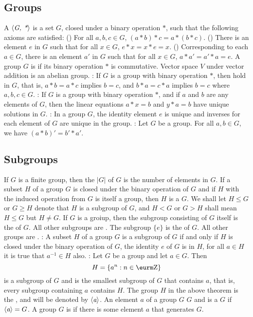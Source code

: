\documentclass{myproc}
\def\sbf{\sf\bfseries}
\begin{document}
\subsection{Groups}
\bit
\w A  $\mbox{$\langle{\textit{G, *}}\rangle$}$ is a set $G$, closed under a binary operation
$*$, such that the following axioms are satisfied:
  \ben
  \w [(a)] () 
  For all $a, b, c \in G$, $(a * b) * c = a * (b * c)$.
  \w [(b)] ()
  There is an element $e$ in $G$ such that for all $x \in G$,
  $e * x = x * e = x$.
  \w [(c)] ()
  Corresponding to each $a \in G$, there is an element 
  $a'$ in $G$ such that for all $x \in G$,
  $a * a' = a' * a = e$.
  \een
\w A group $G$ is  if its binary operation $*$ is commutative.
\w Vector space $V$ under vector addition is an abelian group.
\w {\sbf Theorem}: If $G$ is a group with binary operation $*$, then  hold in $G$, that is, $a * b = a * c$
implies $b = c$, and $b * a = c * a$ implies $b = c$ where $a, b, c \in G$.
\w {\sbf Theorem}: If $G$ is a group with binary operation $*$, and if $a$ and
$b$ are any elements of $G$, then the linear equations $a * x = b$ and $y * a
= b$ have unique solutions in $G$.
\w {\sbf Theorem}: In a group $G$,  the identity element $e$ is
unique and inverses for each element of $G$ are unique in the group.
\w {\sbf Corollary}: Let $G$ be a group. For all $a, b \in G$, we have $(a *
b)' = b' * a'$.
\eit

\subsection{Subgroups}
\bit
\w If $G$ is a finite group, then the  $|G|$ of $G$ is the number of
elements in $G$. 
\w If a subset $H$ of a group $G$ is closed under the binary operation of $G$
and if $H$ with the induced operation from $G$ is itself a group, then $H$ is
a  $G$. We shall let $H \le G$ or $G \ge H$ denote that $H$ is
a subgroup of $G$, and $H < G$ or $G > H$ shall mean $H \le G$ but $H \ne G$.
\w If $G$ is a groiup, then the subgroup consisting of $G$ itself is the
 of $G$. All other subgroups are . The subgroup $\{e\}$ is the  of $G$. All
other groups are .
\w {\sbf Theorem}: A subset $H$ of a group $G$ is a subgroup of $G$ if and
only if 
  \ben
  \w [(a)] $H$ is closed under the binary operation of $G$,
  \w [(b)] the identity $e$ of $G$ is in $H$,
  \w [(c)] for all $a \in H$ it is true that $a^{-1} \in H$ also.
  \een
\w {\sbf Theorem}: Let $G$ be a group and let $a \in G$. Then
  \[ H = \{a^n: n \in \Z\}\]
 is a subgroup of $G$ and is the smallest subgroup of $G$ that contains $a$,
 that is, every subgroup containing $a$ contains $H$.
\w The group $H$ in the above theorem is the , and will be denoted by $\mbox{$\langle{\textit{a}}\rangle$}$.
\w An element $a$ of a group $G$  $G$ and is a  $G$ if $\mbox{$\langle{\textit{a}}\rangle$} = G$. A group $G$ is  if there is some
 element $a$ that generates $G$.
\eit
\end{document}
